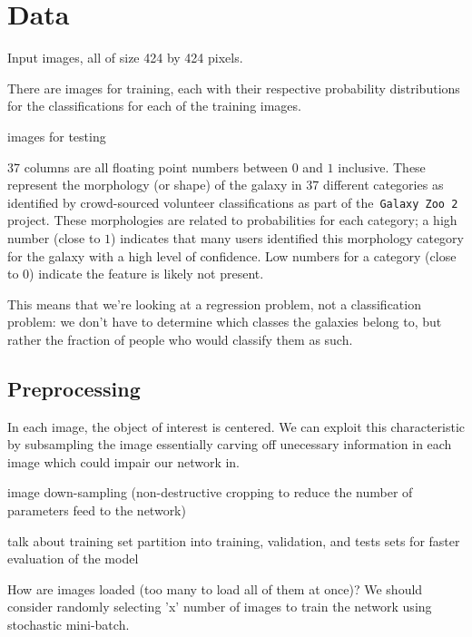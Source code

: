 \section{Data}

Input images, all of size 424 by 424 pixels.

There are  images for training, each with their respective probability distributions for the classifications for each of the training images.

 images for testing

37 columns are all floating point numbers between $0$ and $1$ inclusive. These represent the morphology (or shape) of the galaxy in 37 different categories as identified by crowd-sourced volunteer classifications as part of the~\texttt{Galaxy Zoo 2} project. These morphologies are related to probabilities for each category; a high number (close to $1$) indicates that many users identified this morphology category for the galaxy with a high level of confidence. Low numbers for a category (close to $0$) indicate the feature is likely not present.

This means that we’re looking at a regression problem, not a classification problem: we don’t have to determine which classes the galaxies belong to, but rather the fraction of people who would classify them as such.

\subsection{Preprocessing}

In each image, the object of interest is centered. We can exploit this characteristic by subsampling the image essentially carving off unecessary information in each image which could impair our network in.

image down-sampling (non-destructive cropping to reduce the number of parameters feed to the network)

talk about training set partition into training, validation, and tests sets for faster evaluation of the model

How are images loaded (too many to load all of them at once)? We should consider randomly selecting 'x' number of images to train the network using stochastic mini-batch.
